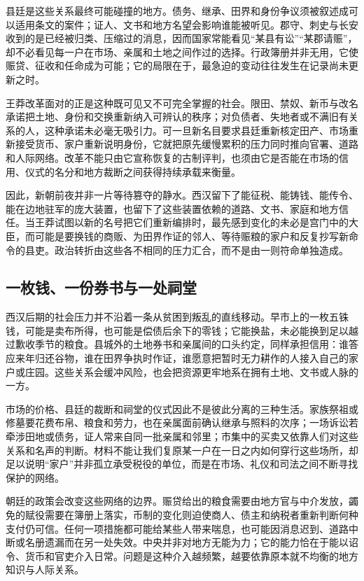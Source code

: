 县廷是这些关系最终可能碰撞的地方。债务、继承、田界和身份争议须被叙述成可以适用条文的案件；证人、文书和地方名望会影响谁能被听见。郡守、刺史与长安收到的是已经被归类、压缩过的消息，因而国家常能看见“某县有讼”“某郡请赈”，却不必看见每一户在市场、亲属和土地之间作过的选择。行政簿册并非无用，它使赈贷、征收和任命成为可能；它的局限在于，最急迫的变动往往发生在记录尚未更新之时。

王莽改革面对的正是这种既可见又不可完全掌握的社会。限田、禁奴、新币与改名承诺把土地、身份和交换重新纳入可辨认的秩序；对负债者、失地者或不满旧有关系的人，这种承诺未必毫无吸引力。可一旦新名目要求县廷重新核定田产、市场重新接受货币、家户重新说明身份，它就把原先缓慢累积的压力同时推向官署、道路和人际网络。改革不能只由它宣称恢复的古制评判，也须由它是否能在市场的信用、仪式的名分和地方裁断之间获得持续承载来衡量。

因此，新朝前夜并非一片等待篡夺的静水。西汉留下了能征税、能铸钱、能传令、能在边地驻军的庞大装置，也留下了这些装置依赖的道路、文书、家庭和地方信任。当王莽试图以新的名号把它们重新编排时，最先感到变化的未必是宫门中的大臣，而可能是要换钱的商贩、为田界作证的邻人、等待赈粮的家户和反复抄写新命令的县吏。政治转折由这些各不相同的压力汇合，而不是由一则符命单独造成。

\subsection{一枚钱、一份券书与一处祠堂}

西汉后期的社会压力并不沿着一条从贫困到叛乱的直线移动。早市上的一枚五铢钱，可能是卖布所得，也可能是偿债后余下的零钱；它能换盐，未必能换到足以越过歉收季节的粮食。县城外的土地券书和亲属间的口头约定，同样承担信用：谁答应来年归还谷物，谁在田界争执时作证，谁愿意把暂时无力耕作的人接入自己的家户或庄园。这些关系会缓冲风险，也会把资源更牢地系在拥有土地、文书或人脉的一方。

市场的价格、县廷的裁断和祠堂的仪式因此不是彼此分离的三种生活。家族祭祖或修墓要花费布帛、粮食和劳力，也在亲属面前确认继承与照料的次序；一场诉讼若牵涉田地或债务，证人常来自同一批亲属和邻里；市集中的买卖又依靠人们对这些关系和名声的判断。材料不能让我们复原某一户在一日之内如何穿行这些场所，却足以说明“家户”并非孤立承受税役的单位，而是在市场、礼仪和司法之间不断寻找保护的网络。

朝廷的政策会改变这些网络的边界。赈贷给出的粮食需要由地方官与中介发放，蠲免的赋役需要在簿册上落实，币制的变化则迫使商人、债主和纳税者重新判断何种支付仍可信。任何一项措施都可能给某些人带来喘息，也可能因消息迟到、道路中断或名册遗漏而在另一处失效。中央并非对地方无能为力；它的能力恰在于能以诏令、货币和官吏介入日常。问题是这种介入越频繁，越要依靠原本就不均衡的地方知识与人际关系。

